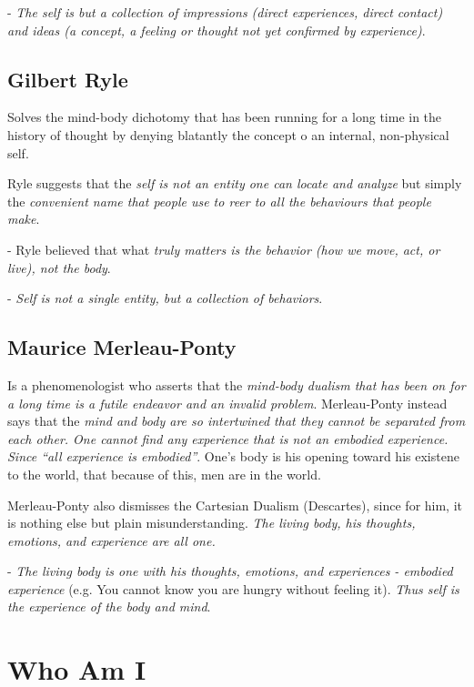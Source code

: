 \documentclass[12pt, UTF8]{article}
\begin{document}
	- \emph{The self is but a collection of impressions (direct experiences, direct contact) and ideas (a concept, a feeling or thought not yet confirmed by experience)}.
	
	\subsection*{Gilbert Ryle}
	
	Solves the mind-body dichotomy that has been running for a long time in the history of thought by denying blatantly the concept o an internal, non-physical self.
	
	Ryle suggests that the \emph{self is not an entity one can locate and analyze} but simply the \textit{convenient name that people use to reer to all the behaviours that people make}.
	
	- Ryle believed that what \emph{truly matters is the behavior (how we move, act, or live), not the body}.
	
	- \emph{Self is not a single entity, but a collection of behaviors}.
	
	\subsection*{Maurice Merleau-Ponty}
	
	Is a phenomenologist who asserts that the \textit{mind-body dualism that has been on for a long time is a futile endeavor and an invalid problem}. Merleau-Ponty instead says that the \emph{mind and body are so intertwined that they cannot be separated from each other. One cannot find any experience that is not an embodied experience. Since ``all experience is embodied''}. One's body is his opening toward his existene to the world, that because of this, men are in the world.
	
	Merleau-Ponty also dismisses the Cartesian Dualism (Descartes), since for him, it is nothing else but plain misunderstanding. \emph{The living body, his thoughts, emotions, and experience are all one.}
	
	- \emph{The living body is one with his thoughts, emotions, and experiences - embodied experience} (e.g. You cannot know you are hungry without feeling it). \emph{Thus self is the experience of the body and mind}.
	
	\section*{Who Am I}
	
\end{document}
